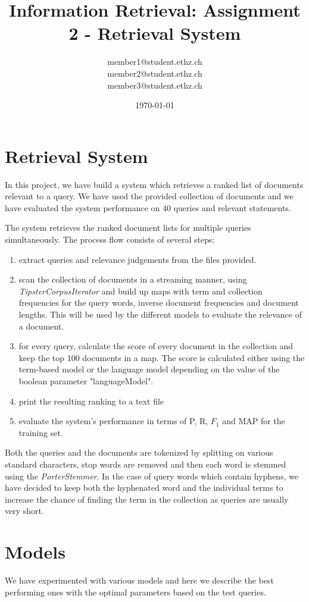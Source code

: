 \documentclass[a4paper, 11pt]{article}
\title{Information Retrieval: Assignment 2 - Retrieval System
}
\author{member1@student.ethz.ch\\ member2@student.ethz.ch\\ member3@student.ethz.ch\\}
\date{\today}
\begin{document}
\maketitle

\section{Retrieval System} 
In this project, we have build a system which retrieves a ranked list of documents relevant to a query. We have used the provided collection of documents and we have evaluated the system performance on 40 queries and relevant statements. 

The system retrieves the ranked document lists  for multiple queries simultaneously. The process flow consists of several steps:
\begin{enumerate}
\item extract queries and relevance judgements from the files provided.
\item scan the collection of documents in a streaming manner, using \textit{TipsterCorpusIterator} and build up maps with term and collection frequencies for the query words, inverse document frequencies and document lengths. This will be used by the different models to evaluate the relevance of a document.

\item for every query, calculate the score of every document in the collection and keep the top 100 documents in a map. The score is calculated either using the term-based model or the language model depending on the value of the boolean parameter "languageModel".

\item print the resulting ranking to a text file

\item evaluate the system's performance in terms of P, R, $F_1$ and MAP for the training set.
\end{enumerate}

Both the queries and the documents are tokenized by splitting on various standard characters, stop words are removed and then each word is stemmed using the \textit{PorterStemmer}. In the case of query words which contain hyphens, we have decided to keep both the hyphenated word and the individual terms to increase the chance of finding the term in the collection as queries are usually very short.

\section{Models}
We have experimented with various models and here we describe the best performing ones with the optimal parameters based on the test queries.
\end{document}
